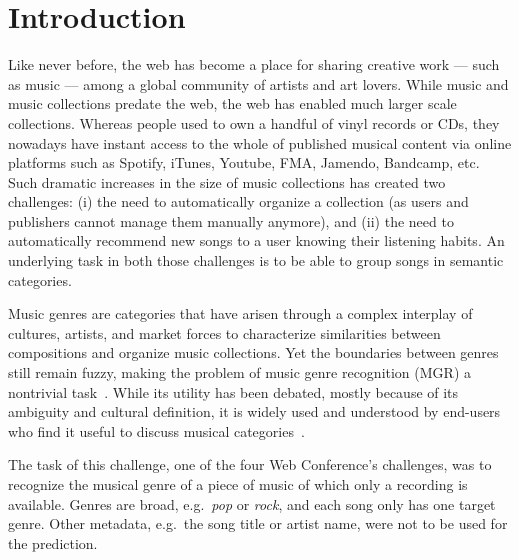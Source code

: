 \documentclass[sigconf]{acmart}
\begin{document}


\maketitle

\section{Introduction}

Like never before, the web has become a place for sharing creative work --- such as music --- among a global community of artists and art lovers. While music and music collections predate the web, the web has enabled much larger scale collections. Whereas people used to own a handful of vinyl records or CDs, they nowadays have instant access to the whole of published musical content via online platforms such as Spotify, iTunes, Youtube, FMA, Jamendo, Bandcamp, etc. Such dramatic increases in the size of music collections has created two challenges: (i) the need to automatically organize a collection (as users and publishers cannot manage them manually anymore), and (ii) the need to automatically recommend new songs to a user knowing their listening habits. An underlying task in both those challenges is to be able to group songs in semantic categories.

Music genres are categories that have arisen through a complex interplay of cultures, artists, and market forces to characterize similarities between compositions and organize music collections. Yet the boundaries between genres still remain fuzzy, making the problem of music genre recognition (MGR) a nontrivial task~\cite{mir_review_genre}. While its utility has been debated, mostly because of its ambiguity and cultural definition, it is widely used and understood by end-users who find it useful to discuss musical categories~\cite{mgr_why}.

The task of this challenge, one of the four Web Conference's challenges, was to recognize the musical genre of a piece of music of which only a recording is available. Genres are broad, e.g.\ \textit{pop} or \textit{rock}, and each song only has one target genre.
Other metadata, e.g.\ the song title or artist name, were not to be used for the prediction.
\end{document}
